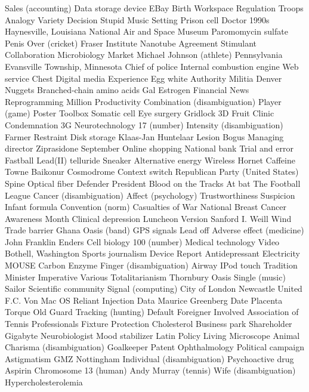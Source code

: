 Sales (accounting)  Data storage device  EBay  
Birth  Workspace  Regulation  
Troops  Analogy  Variety  
Decision  Stupid  Music  
Setting  Prison cell  Doctor  
1990s  Haynesville, Louisiana  National Air and Space Museum  
Paromomycin sulfate  Penis  Over (cricket)  
Fraser Institute  Nanotube  Agreement  
Stimulant  Collaboration  Microbiology  
Market  Michael Johnson (athlete)  Pennsylvania  
Evansville Township, Minnesota  Chief of police  Internal combustion engine  
Web service  Chest  Digital media  
Experience  Egg white  Authority  
Militia  Denver Nuggets  Branched-chain amino acids  
Gal  Estrogen  Financial News  
Reprogramming  Million  Productivity  
Combination (disambiguation)  Player (game)  Poster  
Toolbox  Somatic cell  Eye surgery  
Gridlock  3D  Fruit  
Clinic  Condemnation  3G  
Neurotechnology  17 (number)  Intensity (disambiguation)  
Farmer  Restraint  Disk storage  
Klaas-Jan Huntelaar  Lesion  Bogus  
Managing director  Ziprasidone  September  
Online shopping  National bank  Trial and error  
Fastball  Lead(II) telluride  Sneaker  
Alternative energy  Wireless  Hornet  
Caffeine  Towne  Baikonur Cosmodrome  
Context switch  Republican Party (United States)  Spine  
Optical fiber  Defender  President  
Blood on the Tracks  At bat  The Football League  
Cancer (disambiguation)  Affect (psychology)  Trustworthiness  
Suspicion  Infant formula  Convention (norm)  
Casualties of War  National Breast Cancer Awareness Month  Clinical depression  
Luncheon  Version  Sanford I. Weill  
Wind  Trade barrier  Ghana  
Oasis (band)  GPS signals  Lead off  
Adverse effect (medicine)  John Franklin Enders  Cell biology  
100 (number)  Medical technology  Video  
Bothell, Washington  Sports journalism  Device  
Report  Antidepressant  Electricity  
MOUSE  Carbon  Enzyme  
Finger (disambiguation)  Airway  IPod touch  
Tradition  Minister  Imperative  
Various  Totalitarianism  Thornbury  
Oasis  Single (music)  Sailor  
Scientific community  Signal (computing)  City of London  
Newcastle United F.C.  Von  Mac OS  
Reliant  Injection  Data  
Maurice Greenberg  Date  Placenta  
Torque  Old  Guard  
Tracking (hunting)  Default  Foreigner  
Involved  Association of Tennis Professionals  Fixture  
Protection  Cholesterol  Business park  
Shareholder  Gigabyte  Neurobiologist  
Mood stabilizer  Latin  Policy  
Living  Microscope  Animal  
Charisma (disambiguation)  Goalkeeper  Patent  
Ophthalmology  Political campaign  Astigmatism  
GMZ  Nottingham  Individual (disambiguation)  
Psychoactive drug  Aspirin  Chromosome 13 (human)  
Andy Murray (tennis)  Wife (disambiguation)  Hypercholesterolemia  
